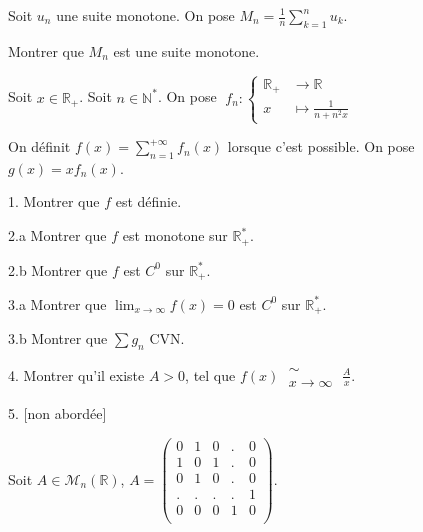 \subetoiles



\noindent Soit $u_n$ une suite monotone.
On pose $\displaystyle M_n = \frac {1} {n} \sum_{k = 1}^{n} u_k$.

\vspace{5pt}
\noindent Montrer que $M_n$ est une suite monotone.



\subetoiles
\columnbreak



\noindent Soit $x \in \mathbb{R}_+$. Soit $n \in \mathbb{N}^*$.
\noindent On pose
$\; f_n :
\begin{cases}
  \mathbb{R}_+  & \longrightarrow \mathbb{R}\\    
  x & \longmapsto \displaystyle \frac {1} {n + n^2x}
\end{cases}
$

\noindent On définit $\displaystyle f(x) = \sum_{n=1}^{+\infty}f_n(x)$ lorsque c'est possible.
\noindent On pose $g(x) = xf_n(x)$.

\vspace{5pt}
1. Montrer que $f$ est définie.

\vspace{5pt}
2.a Montrer que $f$ est monotone sur $\mathbb{R}_+^*$.

\vspace{5pt}
2.b Montrer que $f$ est $C^0$ sur $\mathbb{R}_+^*$.

\vspace{5pt}
3.a Montrer que $\displaystyle \lim_{x\to\infty} f(x) = 0$ est $C^0$ sur $\mathbb{R}_+^*$.

\vspace{5pt}
3.b Montrer que $\sum g_n$ CVN.

\vspace{5pt}
4. Montrer qu'il existe $A > 0$, tel que $\displaystyle f(x) \; \substack{\sim \\ x\to\infty} \; \frac {A} {x}$.

\vspace{5pt}
5. [non abordée]




\subetoiles




\noindent Soit $A \in \mathcal{M}_n(\mathbb{R})$, $A =
\begin{pmatrix}
0 & 1 & 0 & . & 0 \\
1 & 0 & 1 & . & 0 \\
0 & 1 & 0 & . & 0 \\
. & . & . & . & 1 \\
0 & 0 & 0 & 1 & 0 \\
\end{pmatrix}
$.

